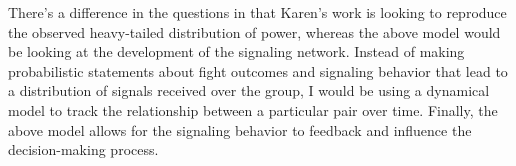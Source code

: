 \documentclass{article}
\begin{document}
There's a difference in the questions in that Karen's work is looking to reproduce the observed heavy-tailed distribution of power, whereas the above model would be looking at the development of the signaling network.  Instead of making probabilistic statements about fight outcomes and signaling behavior that lead to a distribution of signals received over the group, I would be using a dynamical model to track the relationship between a particular pair over time.  Finally, the above model allows for the signaling behavior to feedback and influence the decision-making process.
\end{document}
